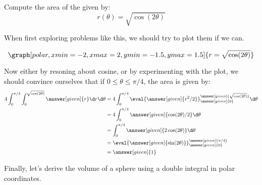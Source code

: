 \documentclass{ximera}
\begin{document}
\begin{example}
  Compute the area of the
   given by:
  \[
  r(\theta) = \sqrt{\cos(2\theta)}
  \]
  \begin{explanation}
    When first exploring problems like this, we should try to plot them if we can.
    \begin{onlineOnly}
      \[
      \graph[polar,xmin=-2, xmax=2, ymin=-1.5, ymax=1.5]{r=\sqrt{\cos(2\theta)}}
      \]
    \end{onlineOnly}
    Now either by resoning about cosine, or by experimenting with the
    plot, we should convince ourselves that if $0\le \theta\le \pi/4$,
    the area is given by:
    \begin{align*}
      4\int_{0}^{\pi/4} \int_{0}^{\sqrt{\cos(2\theta)}}\answer[given]{r} \d r \d \theta
      &= 4\int_{0}^{\pi/4} \eval{\answer[given]{r^2/2}}_{\answer[given]{0}}^{\answer[given]{\sqrt{\cos(2\theta)}}}  \d \theta\\
      &= 4\int_{0}^{\pi/4} \answer[given]{\cos(2\theta)/2}  \d \theta\\
      &= \int_{0}^{\pi/4} \answer[given]{2\cos(2\theta)}  \d \theta\\
      &= \eval{\answer[given]{\sin(2\theta)}}_{\answer[given]{0}}^{\answer[given]{\pi/4}}  \\
      &= \answer[given]{1}
    \end{align*}
  \end{explanation}
\end{example}

Finally, let's derive the volume of a sphere using a double integral
in polar coordinates.
\end{document}
